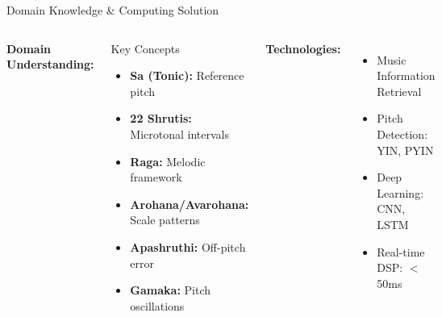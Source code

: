 \documentclass[aspectratio=169,11pt]{beamer}
\begin{document}
	\begin{frame}{Domain Knowledge \& Computing Solution}
		
		\begin{columns}[t]
			\textbf{Domain Understanding:}
			
			\begin{block}{Key Concepts}
				\begin{itemize}
					\tiny
					\item \textbf{Sa (Tonic):} Reference pitch
					\item \textbf{22 Shrutis:} Microtonal intervals
					\item \textbf{Raga:} Melodic framework
					\item \textbf{Arohana/Avarohana:} Scale patterns
					\item \textbf{Apashruthi:} Off-pitch error
					\item \textbf{Gamaka:} Pitch oscillations
				\end{itemize}
			\end{block}
			
			\textbf{Technologies:}
			\begin{itemize}
				\tiny
				\item Music Information Retrieval
				\item Pitch Detection: YIN, PYIN
				\item Deep Learning: CNN, LSTM
				\item Real-time DSP: $<$50ms
			\end{itemize}
			

\end{columns}
\end{frame}
\end{document}
